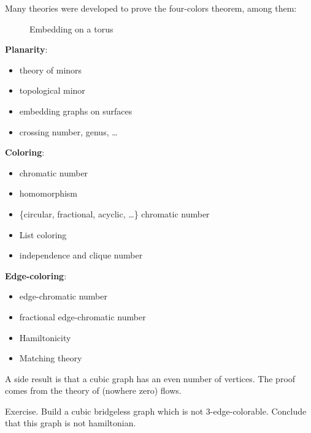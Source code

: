 \documentclass[12pt,a4paper]{article}
\begin{document}
Many theories were developed to prove the four-colors theorem, among them:

\begin{wrapfigure}{r}{0.5\textwidth}
  \begin{center}
  \caption{Embedding on a torus}
  \end{center}
\end{wrapfigure}

\textbf{Planarity}:
\begin{itemize}
\item theory of minors
\item topological minor
\item embedding graphs on surfaces
\item crossing number, genus, …
\end{itemize}
\vspace{0.3cm}

\textbf{Coloring}:
\begin{itemize}
\item chromatic number
\item homomorphism
\item \{circular, fractional, acyclic, …\} chromatic number
\item List coloring
\item independence and clique number
\end{itemize}
\vspace{0.3cm}

\textbf{Edge-coloring}:
\begin{itemize}
\item edge-chromatic number
\item fractional edge-chromatic number
\item Hamiltonicity
\item Matching theory
\end{itemize}
\vspace{0.3cm}

A side result is that a cubic graph has an even number of vertices. The proof
comes from the theory of (nowhere zero) flows.

Exercise. Build a cubic bridgeless graph which is not 3-edge-colorable. Conclude
that this graph is not hamiltonian.
\end{document}
